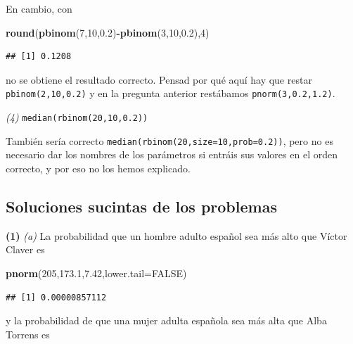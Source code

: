 \documentclass[]{book}
\newenvironment{Shaded}{\begin{snugshade}}{\end{snugshade}}
\newcommand{\DataTypeTok}[1]{\textcolor[rgb]{0.13,0.29,0.53}{#1}}
\newcommand{\DecValTok}[1]{\textcolor[rgb]{0.00,0.00,0.81}{#1}}
\newcommand{\FloatTok}[1]{\textcolor[rgb]{0.00,0.00,0.81}{#1}}
\newcommand{\KeywordTok}[1]{\textcolor[rgb]{0.13,0.29,0.53}{\textbf{#1}}}
\newcommand{\NormalTok}[1]{#1}
\newcommand{\OperatorTok}[1]{\textcolor[rgb]{0.81,0.36,0.00}{\textbf{#1}}}
\newcommand{\OtherTok}[1]{\textcolor[rgb]{0.56,0.35,0.01}{#1}}
\theoremstyle{definition}
\theoremstyle{definition}
\theoremstyle{definition}
\theoremstyle{remark}
\begin{document}
En cambio, con

\begin{Shaded}
\begin{Highlighting}[]
\KeywordTok{round}\NormalTok{(}\KeywordTok{pbinom}\NormalTok{(}\DecValTok{7}\NormalTok{,}\DecValTok{10}\NormalTok{,}\FloatTok{0.2}\NormalTok{)}\OperatorTok{-}\KeywordTok{pbinom}\NormalTok{(}\DecValTok{3}\NormalTok{,}\DecValTok{10}\NormalTok{,}\FloatTok{0.2}\NormalTok{),}\DecValTok{4}\NormalTok{)}
\end{Highlighting}
\end{Shaded}

\begin{verbatim}
## [1] 0.1208
\end{verbatim}

no se obtiene el resultado correcto. Pensad por qué aquí hay que restar \texttt{pbinom(2,10,0.2)} y en la pregunta anterior restábamos \texttt{pnorm(3,0.2,1.2)}.

\emph{(4)} \texttt{median(rbinom(20,10,0.2))}

También sería correcto \texttt{median(rbinom(20,size=10,prob=0.2))}, pero no es necesario dar los nombres de los parámetros si entráis sus valores en el orden correcto, y por eso no los hemos explicado.

\hypertarget{soluciones-sucintas-de-los-problemas}{%
\subsection*{Soluciones sucintas de los problemas}\label{soluciones-sucintas-de-los-problemas}}

\textbf{(1)} \emph{(a)} La probabilidad que un hombre adulto español sea más alto que Víctor Claver es

\begin{Shaded}
\begin{Highlighting}[]
\KeywordTok{pnorm}\NormalTok{(}\DecValTok{205}\NormalTok{,}\FloatTok{173.1}\NormalTok{,}\FloatTok{7.42}\NormalTok{,}\DataTypeTok{lower.tail=}\OtherTok{FALSE}\NormalTok{)}
\end{Highlighting}
\end{Shaded}

\begin{verbatim}
## [1] 0.00000857112
\end{verbatim}

y la probabilidad de que una mujer adulta española sea más alta que Alba Torrens es
\end{document}
